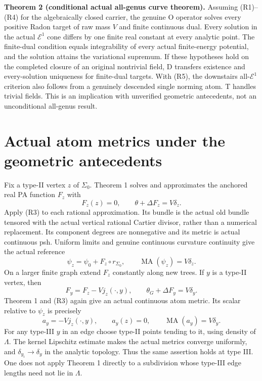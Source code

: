 \documentclass[
  11pt,
]{article}
\begin{document}
\textbf{Theorem 2 (conditional actual all-genus curve theorem).}
Assuming (R1)--(R4) for the algebraically closed carrier, the genuine O
operator solves every positive Radon target of raw mass \(V\) and finite
continuous dual. Every solution in the actual \(\mathcal E^1\) cone
differs by one finite real constant at every analytic point. The
finite-dual condition equals integrability of every actual finite-energy
potential, and the solution attains the variational supremum. If these
hypotheses hold on the completed closure of an original nontrivial
field, D transfers existence and every-solution uniqueness for
finite-dual targets. With (R5), the downstairs all-\(\mathcal E^1\)
criterion also follows from a genuinely descended single norming atom. T
handles trivial fields. This is an implication with unverified geometric
antecedents, not an unconditional all-genus result.

\section{Actual atom metrics under the geometric
antecedents}\label{actual-atom-metrics-under-the-geometric-antecedents}

Fix a type-II vertex \(z\) of \(\Sigma_0\). Theorem 1 solves and
approximates the anchored real PA function \(F_z\) with \[
 F_z(z)=0,\qquad\theta+\Delta F_z=V\delta_z.
\] Apply (R3) to each rational approximation. Its bundle is the actual
old bundle tensored with the actual vertical rational Cartier divisor,
rather than a numerical replacement. Its component degrees are
nonnegative and its metric is actual continuous psh. Uniform limits and
genuine continuous curvature continuity give the actual reference \[
 \psi_z=\psi_0+F_z\circ r_{\Sigma_0},\qquad\operatorname{MA}(\psi_z)=V\delta_z.
\] On a larger finite graph extend \(F_z\) constantly along new trees.
If \(y\) is a type-II vertex, then \[
 F_y=F_z-Vj_z(\cdot,y),\qquad\theta_G+\Delta F_y=V\delta_y.
\] Theorem 1 and (R3) again give an actual continuous atom metric. Its
scalar relative to \(\psi_z\) is precisely \[
 a_y=-Vj_z(\cdot,y),\qquad a_y(z)=0,\qquad\operatorname{MA}(a_y)=V\delta_y.
\] For any type-III \(y\) in an edge choose type-II points tending to
it, using density of \(\Lambda\). The kernel Lipschitz estimate makes
the actual metrics converge uniformly, and \(\delta_{y_i}\to\delta_y\)
in the analytic topology. Thus the same assertion holds at type III. One
does not apply Theorem 1 directly to a subdivision whose type-III edge
lengths need not lie in \(\Lambda\).
\end{document}

